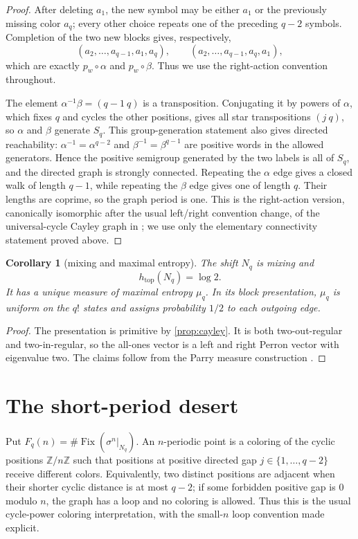\documentclass[11pt,a4paper]{amsart}
\newtheorem{corollary}[theorem]{Corollary}
\theoremstyle{definition}
\theoremstyle{remark}
\newcommand{\Fix}{\operatorname{Fix}}
\newcommand{\Z}{\mathbb Z}
\begin{document}
\begin{proof}
After deleting $a_1$, the new symbol may be either $a_1$ or the previously
missing color $a_q$; every other choice repeats one of the preceding $q-2$
symbols.  Completion of the two new blocks gives, respectively,
\[
 (a_2,\ldots,a_{q-1},a_1,a_q),\qquad
 (a_2,\ldots,a_{q-1},a_q,a_1),
\]
which are exactly $p_w\circ\alpha$ and $p_w\circ\beta$.  Thus we use the
right-action convention throughout.

The element $\alpha^{-1}\beta=(q-1\ q)$ is a transposition.  Conjugating it
by powers of $\alpha$, which fixes $q$ and cycles the other positions, gives
all star transpositions $(j\ q)$, so $\alpha$ and $\beta$
generate $S_q$.  This group-generation statement also gives directed
reachability: $\alpha^{-1}=\alpha^{q-2}$ and
$\beta^{-1}=\beta^{q-1}$ are positive words in the allowed generators.
Hence the positive semigroup generated by the two labels is all of $S_q$,
and the directed graph is strongly connected.  Repeating the $\alpha$ edge gives a
closed walk of length $q-1$, while repeating the $\beta$ edge gives one of
length $q$.  Their lengths are coprime, so the graph period is one.
This is the right-action version, canonically isomorphic after the usual
left/right convention change, of the universal-cycle Cayley graph in
\cite{RuskeyWilliams2010}; we use only the elementary connectivity statement
proved above.
\end{proof}

\begin{corollary}[mixing and maximal entropy]\label{cor:parry}
The shift $N_q$ is mixing and
\[
 h_{\mathrm{top}}(N_q)=\log2.
\]
It has a unique measure of maximal entropy $\mu_q$.  In its block
presentation, $\mu_q$ is uniform on the $q!$ states and assigns probability
$1/2$ to each outgoing edge.
\end{corollary}

\begin{proof}
The presentation is primitive by \cref{prop:cayley}.  It is both
two-out-regular and two-in-regular, so the all-ones vector is a left and
right Perron vector with eigenvalue two.  The claims follow from the Parry
measure construction \cite{Parry1964}.
\end{proof}

\section{The short-period desert}

Put $F_q(n)=\#\Fix(\sigma^n|_{N_q})$.  An $n$-periodic point is a coloring
of the cyclic positions $\Z/n\Z$ such that positions at positive directed
gap $j\in\{1,\ldots,q-2\}$ receive different colors.  Equivalently, two
distinct positions are adjacent when their shorter cyclic distance is at
most $q-2$; if some forbidden positive gap is $0$ modulo $n$, the graph has a
loop and no coloring is allowed.  Thus this is the usual cycle-power coloring
interpretation, with the small-$n$ loop convention made explicit.
\end{document}
